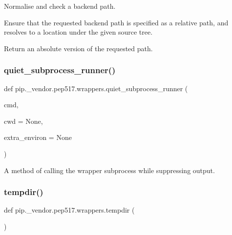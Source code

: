 \begin{DoxyVerb}Normalise and check a backend path.

Ensure that the requested backend path is specified as a relative path,
and resolves to a location under the given source tree.

Return an absolute version of the requested path.
\end{DoxyVerb}
 \mbox{\label{namespacepip_1_1__vendor_1_1pep517_1_1wrappers_a1689b35b066adc0bf1134063047e5376}} 
\subsubsection{\texorpdfstring{quiet\+\_\+subprocess\+\_\+runner()}{quiet\_subprocess\_runner()}}
{\footnotesize\ttfamily def pip.\+\_\+vendor.\+pep517.\+wrappers.\+quiet\+\_\+subprocess\+\_\+runner (\begin{DoxyParamCaption}\item[{}]{cmd,  }\item[{}]{cwd = {\ttfamily None},  }\item[{}]{extra\+\_\+environ = {\ttfamily None} }\end{DoxyParamCaption})}

\begin{DoxyVerb}A method of calling the wrapper subprocess while suppressing output.\end{DoxyVerb}
 \mbox{\label{namespacepip_1_1__vendor_1_1pep517_1_1wrappers_a72a2439d5dd78f24fc642bc33542528c}} 
\subsubsection{\texorpdfstring{tempdir()}{tempdir()}}
{\footnotesize\ttfamily def pip.\+\_\+vendor.\+pep517.\+wrappers.\+tempdir (\begin{DoxyParamCaption}{ }\end{DoxyParamCaption})}

